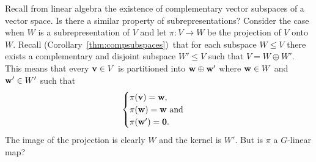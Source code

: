 Recall from linear algebra the existence of complementary vector subspaces of a vector space. Is there a similar property of subrepresentations? Consider the case when $W$ is a subrepresentation of $V$ and let $\pi: V \rightarrow W$ be the projection of $V$ onto $W$. Recall (Corollary~\ref{thm:compsubspaces})~that for each subspace $W\leq V$ there exists a complementary and disjoint subspace $W' \leq V$ such that $V = W \oplus W'$. This means that every $\mathbf{v} \in V$ is partitioned into $\mathbf{w} \oplus \mathbf{w}'$ where $\mathbf{w} \in W$ and $\mathbf{w}' \in W'$ such that 
\begin{align*}
	\begin{cases}
		\pi(\mathbf{v}) = \mathbf{w}, \\
		\pi(\mathbf{w}) = \mathbf{w} \text{ and } \\
		\pi(\mathbf{w}') = \mathbf{0}.
	\end{cases}
\end{align*}
The image of the projection is clearly $W$ and the kernel is $W'$. But is $\pi$ a $G$-linear map?

